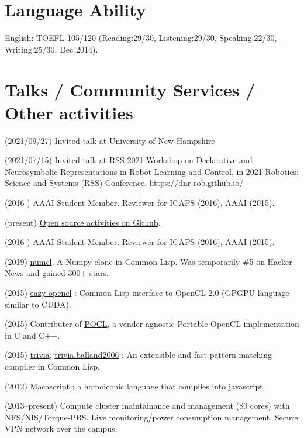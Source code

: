 \documentclass[letterpaper,11pt]{article}
\begin{document}
\section{Language Ability}

\begin{CV}
 \item[English:] TOEFL 105/120 (Reading:29/30, Listening:29/30,
 Speaking:22/30, Writing:25/30, Dec 2014).
\end{CV}

\section{Talks / Community Services / Other activities}

(2021/09/27) Invited talk at University of New Hampshire

(2021/07/15) Invited talk at RSS 2021 Workshop on Declarative and Neurosymbolic Representations in Robot Learning and Control,
in 2021 Robotics: Science and Systems (RSS) Conference. \url{https://dnr-rob.github.io/}

(2016-) AAAI Student Member. Reviewer for ICAPS (2016), AAAI (2015).

(present) \href{https://github.com/guicho271828}{Open source activities on Github}.

(2016-) AAAI Student Member. Reviewer for ICAPS (2016), AAAI (2015).

(2019) \href{https://github.com/numcl/numcl}{numcl},
A Numpy clone in Common Lisp. Was temporarily \#5 on Hacker News and gained 300+ stars.

(2015) \href{https://github.com/guicho271828/eazy-opencl}{eazy-opencl}
: Common Lisp interface to OpenCL 2.0 (GPGPU language similar to CUDA).

(2015) Contributer of \href{https://github.com/pocl/pocl}{POCL},
a vender-agnostic Portable OpenCL implementation in C and C++.

(2015) \href{https://github.com/guicho271828/trivia}{trivia},
\href{https://github.com/guicho271828/trivia.balland2006}{trivia.balland2006}
: An extensible and fast pattern matching compiler in Common Lisp.

(2012) Macascript : a homoiconic language that compiles into javascript.

(2013--present)
 Compute cluster maintainance and management (80 cores) with NFS/NIS/Torque-PBS.
 Live monitoring/power consumption management.
 Secure VPN network over the campus.
\end{document}
